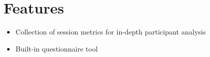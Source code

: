 \vspace{-0.8cm}
\section{Features}

\begin{itemize}[noitemsep,nolistsep]
	
	\item Collection of session metrics for in-depth participant analysis
	\item Built-in questionnaire tool
\end{itemize}

\vspace{-0.6cm}